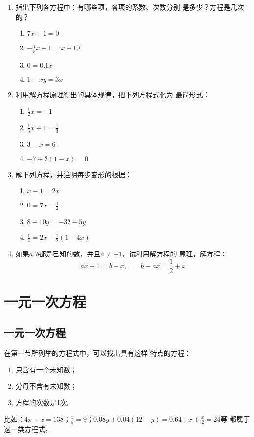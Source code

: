 \begin{enumerate}
\item 指出下列各方程中：有哪些项，各项的系数、次数分别
是多少？方程是几次的？
\begin{multicols}{2}
\begin{enumerate}
    \item $7x+1=0$
    \item $-\frac{1}{5}x-1=x+10$
    \item $0=0.1x$
    \item $1-xy=3x$
\end{enumerate}
\end{multicols}

\item  利用解方程原理得出的具体规律，把下列方程式化为
最简形式：
\begin{multicols}{2}
\begin{enumerate}
    \item $\frac{1}{2}x=-1$
    \item $\frac{1}{3}x+1=\frac{1}{3}$
    \item $3-x=6$
    \item $-7+2(1-x)=0$
\end{enumerate}
\end{multicols}

\item  解下列方程，并注明每步变形的根据：
\begin{multicols}{2}
    \begin{enumerate}
        \item $x-1=2x$
        \item $0=7x-\frac{1}{2}$
        \item $8-10y=-32-5y$
        \item $\frac{1}{4}=2x-\frac{1}{2}(1-4x)$
    \end{enumerate}
    \end{multicols}

\item  如果$a,  b$都是已知的数，并且$a\ne -1$，试利用解方程的
原理，解方程：
\[ax+1=b-x,\qquad b-ax=\frac{1}{2}+x   \]

\end{enumerate}

\section{一元一次方程}
\subsection{一元一次方程}
    在第一节所列举的方程式中，可以找出具有这样
特点的方程：
\begin{enumerate}
    \item 只含有一个未知数；
    \item 分母不含有未知数；
    \item 方程的次数是1次。
\end{enumerate}
比如：$4x+x = 138$；$\frac{x}{5}=9$；$0.08y+0.04(12-y)=0.64$；$x+\frac{x}{2}=24$等
都属于这一类方程式。

